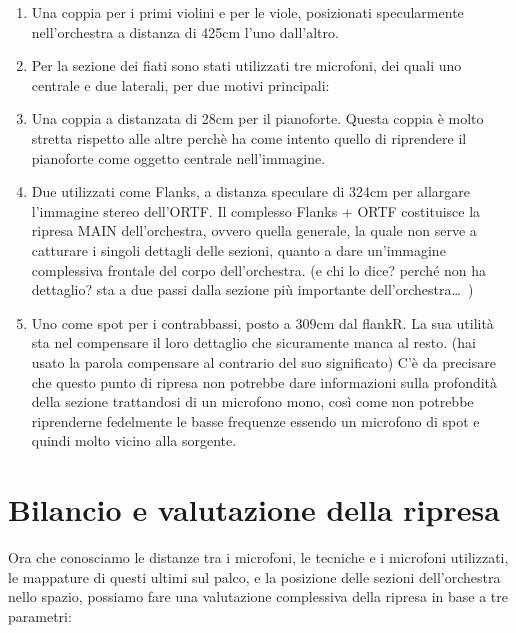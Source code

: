\begin{enumerate}
\item Una coppia per i primi violini e per le viole, posizionati specularmente nell'orchestra a distanza di 425cm l'uno dall'altro.

\item Per la sezione dei fiati sono stati utilizzati tre microfoni, dei quali uno centrale e due laterali, per due motivi principali:

\item Una coppia a distanzata di 28cm per il pianoforte. Questa coppia è molto stretta rispetto alle altre perchè ha come intento quello di riprendere il pianoforte come oggetto centrale nell'immagine.

\item Due utilizzati come Flanks, a distanza speculare di 324cm per allargare l'immagine stereo dell'ORTF. Il complesso Flanks + ORTF costituisce la ripresa MAIN dell'orchestra, ovvero quella generale, la quale non serve a catturare i singoli dettagli delle sezioni, quanto a dare un'immagine complessiva frontale del corpo dell'orchestra.
(e chi lo dice? perché non ha dettaglio? sta a due passi dalla sezione più importante dell'orchestra… )

\item Uno come spot per i contrabbassi, posto a 309cm dal flankR. La sua utilità sta nel compensare il loro dettaglio che sicuramente manca al resto. (hai usato la parola compensare al contrario del suo significato) C'è da precisare che questo punto di ripresa non potrebbe dare informazioni sulla profondità della sezione trattandosi di un microfono mono, così come non potrebbe riprenderne fedelmente le basse frequenze essendo un microfono di spot e quindi molto vicino alla sorgente.
\end{enumerate}

\section*{Bilancio e valutazione della ripresa}
Ora che conosciamo le distanze tra i microfoni, le tecniche e i microfoni utilizzati, le mappature di questi ultimi sul palco, e la posizione delle sezioni dell'orchestra nello spazio, possiamo fare una valutazione complessiva della ripresa in base a tre parametri:

